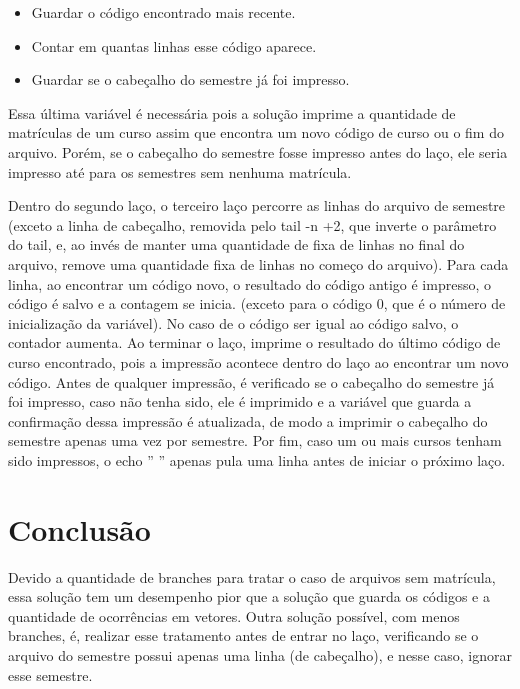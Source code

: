 \documentclass[oneside, 11 pt]{article}
\begin{document}
	\begin{itemize}
		\item Guardar o código encontrado mais recente.
		\item Contar em quantas linhas esse código aparece.
		\item Guardar se o cabeçalho do semestre já foi impresso.
	\end{itemize}

	Essa última variável é necessária pois a solução imprime a quantidade de matrículas de um curso assim que encontra um novo código de curso ou o fim do arquivo. Porém, se o cabeçalho do semestre fosse impresso antes do laço, ele seria impresso até para os semestres sem nenhuma matrícula.
	
	Dentro do segundo laço, o terceiro laço percorre as linhas do arquivo de semestre (exceto a linha de cabeçalho, removida pelo tail -n +2, que inverte o parâmetro do tail, e, ao invés de manter uma quantidade de fixa de linhas no final do arquivo, remove uma quantidade fixa de linhas no começo do arquivo). Para cada linha, ao encontrar um código novo, o resultado do código antigo é impresso, o código é salvo e a contagem se inicia. (exceto para o código 0, que é o número de inicialização da variável). No caso de o código ser igual ao código salvo, o contador aumenta. Ao terminar o laço, imprime o resultado do último código de curso encontrado, pois a impressão acontece dentro do laço ao encontrar um novo código. Antes de qualquer impressão, é verificado se o cabeçalho do semestre já foi impresso, caso não tenha sido, ele é imprimido e a variável que guarda a confirmação dessa impressão é atualizada, de modo a imprimir o cabeçalho do semestre apenas uma vez por semestre. Por fim, caso um ou mais cursos tenham sido impressos, o echo ” ” apenas pula uma linha antes de iniciar o próximo laço.
	
	\section{Conclusão}

	Devido a quantidade de branches para tratar o caso de arquivos sem matrícula, essa solução tem um desempenho pior que a solução que guarda os códigos e a quantidade de ocorrências em vetores. Outra solução possível, com menos branches, é, realizar esse tratamento antes de entrar no laço, verificando se o arquivo do semestre possui apenas uma linha (de cabeçalho), e nesse caso, ignorar esse semestre.		
\end{document}
